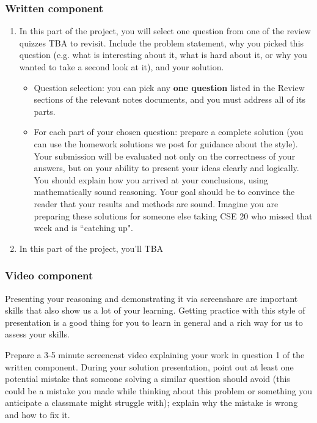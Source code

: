 \subsubsection*{Written component}
\begin{enumerate}
\item In this part of the project, you will select one question from one of the review quizzes 
TBA to revisit. 
Include the problem statement, why you picked this question (e.g. what is interesting about it, 
what is hard about it, or why you wanted to take a second look at it), and your solution. 
    \begin{itemize}
        \item Question selection: you can pick any {\bf one question} listed in the Review 
        sections of the relevant notes documents, and you must address all of its parts.
        \item For each part of your chosen question: prepare a complete solution 
        (you can use the homework solutions we post for guidance about the style). 
        Your submission will be evaluated not only on the correctness of your answers, 
        but on your ability to present your ideas clearly and logically. 
        You should explain how you arrived at your conclusions, using mathematically 
        sound reasoning. Your goal should be to convince the reader that your results 
        and methods are sound. Imagine you are preparing these solutions for someone else 
        taking CSE 20 who missed that week and is ``catching up".
    \end{itemize}
\item In this part of the project, you'll TBA

\end{enumerate}

\subsubsection*{Video component}

Presenting your reasoning and demonstrating it via screenshare are important skills that 
also show us a lot of your learning. Getting practice with this style of presentation 
is a good thing for you to learn in general and a rich way for us to assess your skills. 

Prepare a 3-5 minute screencast video explaining your work in question 1 of the written component.
During your solution presentation, point out at least one potential mistake that someone 
solving a similar question should avoid (this could be a mistake you made while thinking 
about this problem or something you anticipate a classmate might struggle with); 
explain why the mistake is wrong and how to fix it. 

